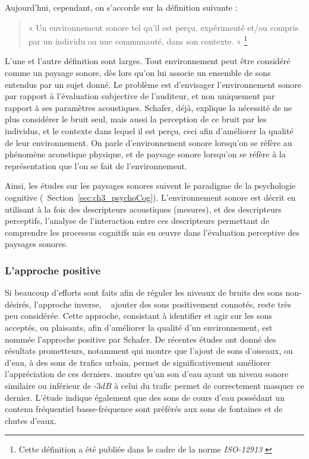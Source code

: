 Aujourd'hui, cependant, on s'accorde sur la définition suivante \citep{aletta2016soundscape}:

\begin{quote}
« Un environnement sonore tel qu'il est perçu, expérimenté et/ou compris par un individu ou une communauté, dans son contexte. » \footnote{Cette définition a été publiée dans le cadre de la norme \emph{ISO-12913} \citep{iso12913}}
\end{quote}

L'une et l'autre définition sont larges. Tout environnement peut être considéré comme un paysage sonore, dès lors qu'on lui associe un ensemble de sons entendus par un sujet donné. Le problème est d'envisager l’environnement sonore par rapport à l'évaluation subjective de l'auditeur, et non uniquement par rapport à ses paramètres acoustiques. Schafer, déjà, explique la nécessité de ne plus considérer le bruit seul, mais aussi la perception de ce bruit par les individus, et le contexte dans lequel il est perçu, ceci afin d'améliorer la qualité de leur environnement. On parle d'environnement sonore lorsqu'on se réfère au phénomène acoustique physique, et de paysage sonore lorsqu'on se réfère à la représentation que l'on se fait de l'environnement.

Ainsi, les études sur les paysages sonores suivent le paradigme de la psychologie cognitive \citep{dubois2006cognitive,maffiolo_caracterisation_1999} (\cf~Section~\ref{sec:ch3_psychoCog}). L'environnement sonore est décrit en utilisant à la fois des descripteurs acoustiques (mesures), et des descripteurs perceptifs, l'analyse de l'interaction entre ces descripteurs permettant de comprendre les processus cognitifs mis en œuvre dans l'évaluation perceptive des paysages sonores.

\subsubsection{L'approche positive}

Si beaucoup d’efforts sont faits afin de réguler les niveaux de bruits des sons non-désirés, l'approche inverse, \ie~ ajouter des sons positivement connotés, reste très peu considérée. Cette approche, consistant à identifier et agir sur les sons acceptés, ou plaisants, afin d'améliorer la qualité d'un environnement, est nommée l'approche positive par Schafer. De récentes études ont donné des résultats prometteurs, notamment \citep{hong2013designing} qui montre que l'ajout de sons d'oiseaux, ou d'eau, à des sons de trafics urbain, permet de significativement améliorer l'appréciation de ces derniers. \citep{galbrun2012perceptual} montre qu'un son d'eau ayant un niveau sonore similaire ou inférieur de -3$dB$ à celui du trafic permet de correctement masquer ce dernier. L'étude indique également que des sons de cours d'eau possédant un contenu fréquentiel basse-fréquence sont préférés aux sons de fontaines et de chutes d'eaux.

